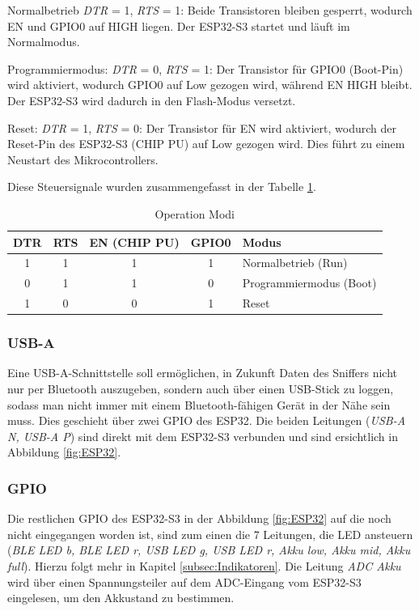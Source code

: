 Normalbetrieb
\textit{DTR} = 1, \textit{RTS} = 1: Beide Transistoren bleiben gesperrt, wodurch EN und GPIO0 auf HIGH liegen. Der ESP32-S3 startet und läuft im Normalmodus.

Programmiermodus:
\textit{DTR} = 0, \textit{RTS} = 1: Der Transistor für GPIO0 (Boot-Pin) wird aktiviert, wodurch GPIO0 auf Low gezogen wird, während EN HIGH bleibt. Der ESP32-S3 wird dadurch in den Flash-Modus versetzt.

Reset:
\textit{DTR} = 1, \textit{RTS} = 0: Der Transistor für EN wird aktiviert, wodurch der Reset-Pin des ESP32-S3 (CHIP PU) auf Low gezogen wird. Dies führt zu einem Neustart des Mikrocontrollers. 

Diese Steuersignale wurden  zusammengefasst in der Tabelle \ref{tab:operation_modes}.
\begin{table}[h]
  \centering
  \begin{tabular}{|c|c|c|c|l|}
    \hline
    DTR & RTS & EN (CHIP PU) & GPIO0 & Modus \\ \hline
    1   & 1   & 1            & 1     & Normalbetrieb (Run) \\ \hline
    0   & 1   & 1            & 0     & Programmiermodus (Boot) \\ \hline
    1   & 0   & 0            & 1     & Reset \\ \hline
  \end{tabular}
  \caption{Operation Modi}
  \label{tab:operation_modes}
\end{table}



\subsubsection{USB-A}
Eine USB-A-Schnittstelle soll ermöglichen, in Zukunft Daten des Sniffers nicht nur per Bluetooth auszugeben, sondern auch über einen USB-Stick zu loggen, sodass man nicht immer mit einem Bluetooth-fähigen Gerät in der Nähe sein muss. Dies geschieht über zwei GPIO des ESP32. Die beiden Leitungen (\textit{USB-A N, USB-A P}) sind direkt mit dem ESP32-S3 verbunden und sind ersichtlich in Abbildung \ref{fig:ESP32}.

\subsubsection{GPIO}
 Die restlichen GPIO des ESP32-S3 in der Abbildung \ref{fig:ESP32} auf die noch nicht eingegangen worden ist, sind zum einen die 7 Leitungen, die LED ansteuern (\textit{BLE LED b, BLE LED r, USB LED g, USB LED r, Akku low, Akku mid, Akku full}). Hierzu folgt mehr in Kapitel \ref{subsec:Indikatoren}. Die Leitung \textit{ADC Akku} wird über einen Spannungsteiler auf dem ADC-Eingang vom ESP32-S3 eingelesen, um den Akkustand zu bestimmen.
 
